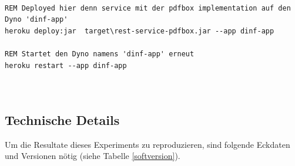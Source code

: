 \documentclass[main.tex]{subfiles}
\begin{document}
\begin{lstlisting}[language=command.com,caption={CLI Deploymentkommandos},captionpos=b]

REM Deployed hier denn service mit der pdfbox implementation auf den Dyno 'dinf-app'
heroku deploy:jar  target\rest-service-pdfbox.jar --app dinf-app

REM Startet den Dyno namens 'dinf-app' erneut
heroku restart --app dinf-app



\end{lstlisting}

\subsection{Technische Details}
Um die Resultate dieses Experiments zu reproduzieren, sind folgende Eckdaten und Versionen nötig (siehe Tabelle \ref{softversion}). 
\end{document}
